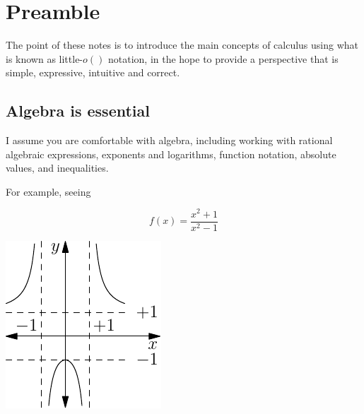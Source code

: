 \chapter*{Preamble}
The point of these notes is to introduce the main concepts of calculus using what is known as little-$o()$ notation, in the hope to provide a perspective that is simple, expressive, intuitive and correct.

\section*{Algebra is essential}
I assume you are comfortable with algebra, including working with rational algebraic expressions, exponents and logarithms, function notation, absolute values, and inequalities.

For example, seeing 

\begin{equation*}
f(x)=\frac{x^2+1}{x^2-1}
\end{equation*}
\begin{marginfigure}
\includegraphics[width=0.75\linewidth]{graphics/algebra1.pdf}
\caption{$y=f(x)=\frac{x^2+1}{x^2-1}$}
\label{fig:algebra1}
\end{marginfigure}

